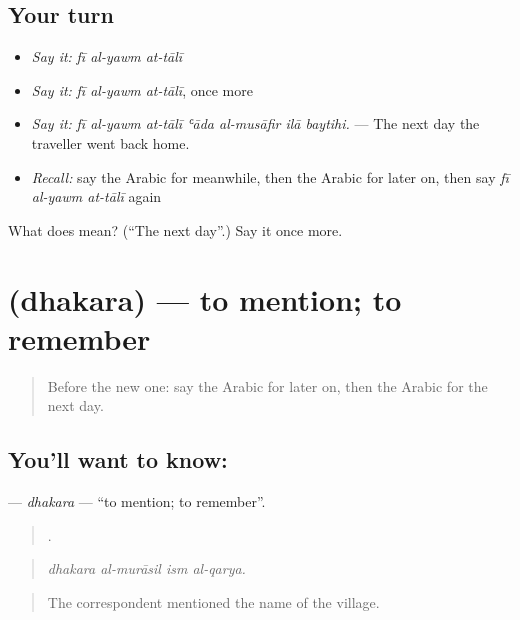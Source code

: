 \subsection*{Your turn}
\begin{itemize}
\raggedright
  \item \emph{Say it:} \emph{fī al-yawm at-tālī}
  \item \emph{Say it:} \emph{fī al-yawm at-tālī}, once more
  \item \emph{Say it:} \emph{fī al-yawm at-tālī ʿāda al-musāfir ilā baytihi.} — The next day the traveller went back home.
  \item \emph{Recall:} say the Arabic for meanwhile, then the Arabic for later on, then say \emph{fī al-yawm at-tālī} again
\end{itemize}

\begin{tcolorbox}[breakable,colback=teal!4,colframe=teal!35!black,title={Before you move on}]
What does    mean? (\textquotedblleft{}The next day\textquotedblright{}.) Say it once more.
\end{tcolorbox}
\section[\texorpdfstring{\ar{ذكر} (dhakara)}{ذكر (dhakara)}]{ (dhakara) — to mention; to remember}

\label{lesson:AR-C299-dhakara-mention}



\begin{quote}
Before the new one: say the Arabic for later on, then the Arabic for the next day.
\end{quote}

\subsection*{You'll want to know: }
\textbf{} — \emph{dhakara} — \textquotedblleft{}to mention; to remember\textquotedblright{}.

\begin{quote}
   .
\end{quote}

\begin{quote}
\emph{dhakara al-murāsil ism al-qarya.}
\end{quote}

\begin{quote}
The correspondent mentioned the name of the village.
\end{quote}

